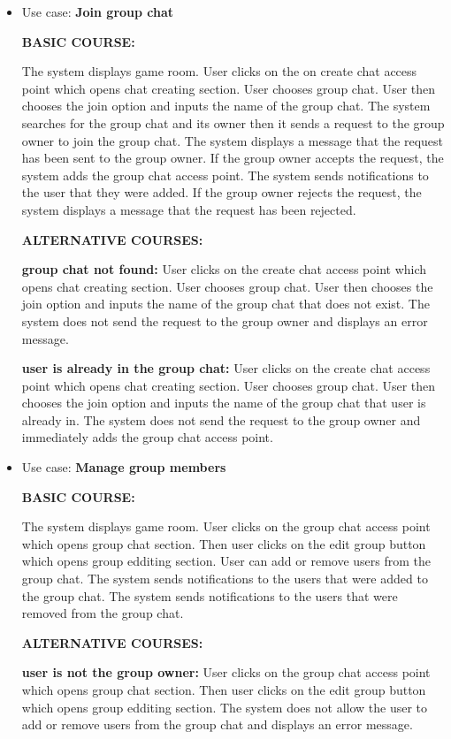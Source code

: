 \documentclass[]{VUMIFTemplateClass}
\begin{document}
\begin{itemize}
    \item 
    Use case: \textbf{Join group chat}

    \textbf{BASIC COURSE:}

    The system displays game room. User clicks on the on create chat access point which opens chat creating section. User chooses group chat. User then chooses the join option and inputs the name of the group chat. The system searches for the group chat and its owner then it sends a request to the group owner to join the group chat. The system displays a message that the request has been sent to the group owner.
    If the group owner accepts the request, the system adds the group chat access point. The system sends notifications to the user that they were added.
    If the group owner rejects the request, the system displays a message that the request has been rejected.

    \textbf{ALTERNATIVE COURSES:}

    \textbf{group chat not found:}
    User clicks on the create chat access point which opens chat creating section. User chooses group chat. User then chooses the join option and inputs the name of the group chat that does not exist. The system does not send the request to the group owner and displays an error message.

    \textbf{user is already in the group chat:}
    User clicks on the create chat access point which opens chat creating section. User chooses group chat. User then chooses the join option and inputs the name of the group chat that user is already in. The system does not send the request to the group owner and immediately adds the group chat access point.

    \item 
    Use case: \textbf{Manage group members}

    \textbf{BASIC COURSE:}

    The system displays game room. User clicks on the group chat access point which opens group chat section. Then user clicks on the edit group button which opens group edditing section. User can add or remove users from the group chat. The system sends notifications to the users that were added to the group chat. The system sends notifications to the users that were removed from the group chat.

    \textbf{ALTERNATIVE COURSES:}

    \textbf{user is not the group owner:}
    User clicks on the group chat access point which opens group chat section. Then user clicks on the edit group button which opens group edditing section. The system does not allow the user to add or remove users from the group chat and displays an error message.


\end{itemize}
\end{document}
